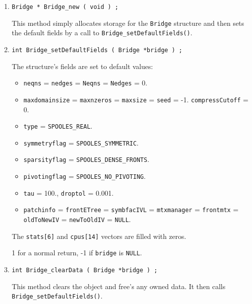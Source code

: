 \begin{enumerate}
\item
\begin{verbatim}
Bridge * Bridge_new ( void ) ;
\end{verbatim}
This method simply allocates storage for the {\tt Bridge} structure 
and then sets the default fields by a call to 
{\tt Bridge\_setDefaultFields()}.
\item
\begin{verbatim}
int Bridge_setDefaultFields ( Bridge *bridge ) ;
\end{verbatim}
The structure's fields are set to default values:
\begin{itemize}
\item
\texttt{neqns} = \texttt{nedges} = \texttt{Neqns} =
\texttt{Nedges} = 0.
\item
\texttt{maxdomainsize} = \texttt{maxnzeros} 
   = \texttt{maxsize} = \texttt{seed} = -1.
\texttt{compressCutoff} = 0.
\item
\texttt{type} = \texttt{SPOOLES\_REAL}.
\item
\texttt{symmetryflag} = \texttt{SPOOLES\_SYMMETRIC}.
\item
\texttt{sparsityflag} = \texttt{SPOOLES\_DENSE\_FRONTS}.
\item
\texttt{pivotingflag} = \texttt{SPOOLES\_NO\_PIVOTING}.
\item
\texttt{tau} = 100., \texttt{droptol} = 0.001.
\item
\texttt{patchinfo} =
\texttt{frontETree} =
\texttt{symbfacIVL} =
\texttt{mtxmanager} =
\texttt{frontmtx} =
\texttt{oldToNewIV} =
\texttt{newToOldIV} = \texttt{NULL}.
\end{itemize}
The \texttt{stats[6]} and \texttt{cpus[14]} vectors are filled 
with zeros.
\par {}
1 for a normal return, -1 if \texttt{bridge} is \texttt{NULL}.
\item
\begin{verbatim}
int Bridge_clearData ( Bridge *bridge ) ;
\end{verbatim}
This method clears the object and free's any owned data.
It then calls {\tt Bridge\_setDefaultFields()}.

\end{enumerate}
